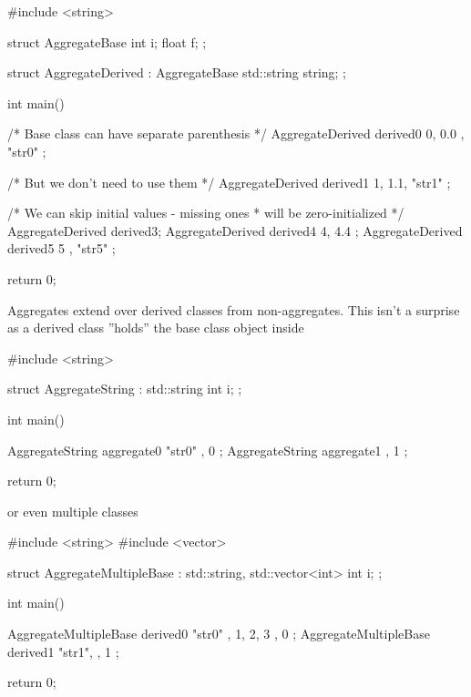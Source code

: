 \documentclass[../main]{subfiles}
\begin{document}
\begin{Code}
    #include <string>
    
    struct AggregateBase
    {
        int i;
        float f;
    };
    
    struct AggregateDerived : AggregateBase
    {
        std::string string;
    };
    
    int main()
    {
        /* Base class can have separate parenthesis */
        AggregateDerived derived0 { { 0, 0.0 }, "str0" };
        
        /* But we don't need to use them */
        AggregateDerived derived1 { 1, 1.1, "str1" };
        
        /* We can skip initial values - missing ones
         * will be zero-initialized
         */
        AggregateDerived derived3;
        AggregateDerived derived4 { 4, 4.4 };
        AggregateDerived derived5 { { 5 }, "str5" };
        
        return 0;
    }
\end{Code}

    Aggregates extend over derived classes from non-aggregates. This
isn't a surprise as a derived class ''holds'' the base class object
inside 
\begin{Code}
    #include <string>
    
    struct AggregateString : std::string
    {
        int i;
    };
    
    int main()
    {
        AggregateString aggregate0 { { "str0" }, 0 };
        AggregateString aggregate1 { {  }, 1 };
        
        return 0;
    }
\end{Code}
\noindent
or even multiple classes
\begin{Code}
    #include <string>
    #include <vector>
    
    struct AggregateMultipleBase : std::string, std::vector<int>
    {
        int i;
    };
    
    int main()
    {
        AggregateMultipleBase derived0 { { "str0" }, { 1, 2, 3 }, 0 };
        AggregateMultipleBase derived1 { "str1", {},  1 };
        
        return 0;
    }
    
\end{Code}
\end{document}
